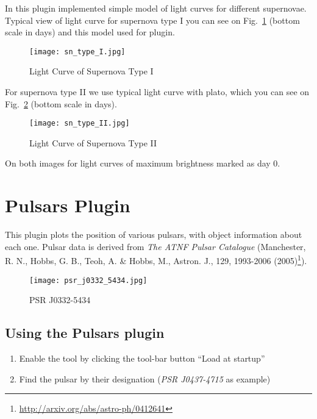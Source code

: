 In this plugin implemented simple model of light curves for different supernovae. Typical view of light curve for supernova type I you can see on Fig.~\ref{fig:SNTypeI} (bottom scale in days) and this model used for plugin.

\begin{figure}[h]
\begin{center}
\texttt{[image: sn\_type\_I.jpg]}
\end{center}
\label{fig:SNTypeI}
\caption{Light Curve of Supernova Type I}
\end{figure}

For supernova type II we use typical light curve with plato, which you can see on Fig.~\ref{fig:SNTypeII} (bottom scale in days).

\begin{figure}[h]
\begin{center}
\texttt{[image: sn\_type\_II.jpg]}
\end{center}
\label{fig:SNTypeII}
\caption{Light Curve of Supernova Type II}
\end{figure}

On both images for light curves of maximum brightness marked as day 0.

\newpage

\section{Pulsars Plugin}
\label{sec:plugins:Pulsars}

This plugin plots the position of various pulsars, with object information about each one. Pulsar data is derived from \textit{The ATNF Pulsar Catalogue} (Manchester, R. N., Hobbs, G. B., Teoh, A. \& Hobbs, M., Astron. J., 129, 1993-2006 (2005)\footnote{\url{http://arxiv.org/abs/astro-ph/0412641}}).

\begin{figure}[h]
\texttt{[image: psr\_j0332\_5434.jpg]}
\label{fig:PSR_J0332-5434}
\caption{PSR J0332-5434}
\end{figure}

\subsection{Using the Pulsars plugin}
\label{sec:plugins:Pulsars:using}

\begin{enumerate}
\item Enable the tool by clicking the tool-bar button ``Load at startup''
\item Find the pulsar by their designation (\emph{PSR J0437-4715} as example)
\end{enumerate}

